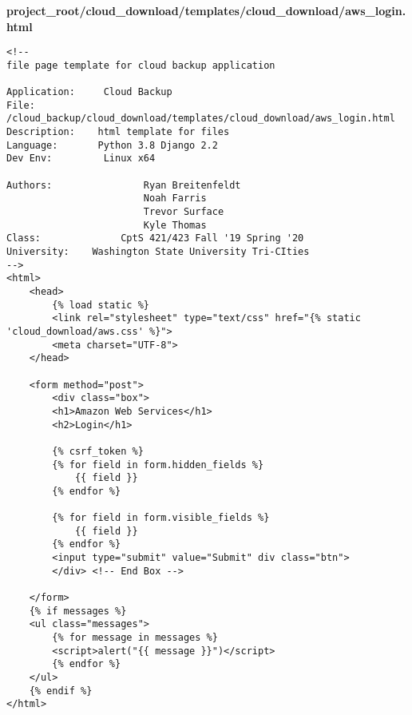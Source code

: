 \documentclass{article}
\begin{document}
\newpage
\textbf{project\_root/cloud\_download/templates/cloud\_download/aws\_login.html}
\begin{verbatim}
<!--
file page template for cloud backup application

Application:     Cloud Backup
File:                 /cloud_backup/cloud_download/templates/cloud_download/aws_login.html
Description:    html template for files
Language:       Python 3.8 Django 2.2
Dev Env:         Linux x64

Authors:                Ryan Breitenfeldt
                        Noah Farris
                        Trevor Surface
                        Kyle Thomas
Class:              CptS 421/423 Fall '19 Spring '20
University:    Washington State University Tri-CIties
-->
<html>
    <head>
        {% load static %}
        <link rel="stylesheet" type="text/css" href="{% static 'cloud_download/aws.css' %}">
        <meta charset="UTF-8">
    </head>

    <form method="post">
        <div class="box">
        <h1>Amazon Web Services</h1>
        <h2>Login</h1>

        {% csrf_token %}
        {% for field in form.hidden_fields %}
            {{ field }}
        {% endfor %}

        {% for field in form.visible_fields %}
            {{ field }}
        {% endfor %}        
        <input type="submit" value="Submit" div class="btn">                  
        </div> <!-- End Box -->
          
    </form>   
    {% if messages %}
    <ul class="messages">
        {% for message in messages %}
        <script>alert("{{ message }}")</script>  
        {% endfor %}
    </ul>
    {% endif %}
</html>
\end{verbatim}
\end{document}
